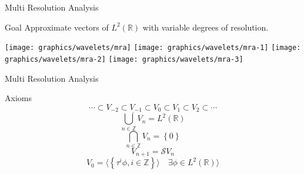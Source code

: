 
    \begin{frame}{Multi Resolution Analysis}
        \centering
         {
            \begin{block}{Goal}
                Approximate vectors of $L^2\left(\mathbb{R}\right)$ with variable degrees of resolution.
            \end{block}
        }
         {
            \texttt{[image: graphics/wavelets/mra]}
        }
         {
            \texttt{[image: graphics/wavelets/mra-1]}
        }
         {
            \texttt{[image: graphics/wavelets/mra-2]}
        }
         {
            \texttt{[image: graphics/wavelets/mra-3]}
        }
    \end{frame}

    \begin{frame}{Multi Resolution Analysis}
        \begin{block}{Axioms}
            \begin{equation}
                \cdots \subset V_{-2} \subset V_{-1} \subset V_0 \subset V_1 \subset V_2 \subset \cdots
            \end{equation}
            \begin{equation}
                \overline{\bigcup\limits_{n \in \mathbb{Z}} V_n} = L^2\left(\mathbb{R}\right)
            \end{equation}
            \begin{equation}
                \bigcap\limits_{n \in \mathbb{Z}} V_n = \left\{0\right\}
            \end{equation}
            \begin{equation}
                V_{n+1} = \mathcal{S}V_n
            \end{equation}
            \begin{equation}
                V_0 = \langle \left\{\tau^i\phi, i \in \mathbb{Z}\right\} \rangle \quad \exists \phi \in L^2\left(\mathbb{R}\right)\rangle
            \end{equation}
        \end{block}
    \end{frame}

